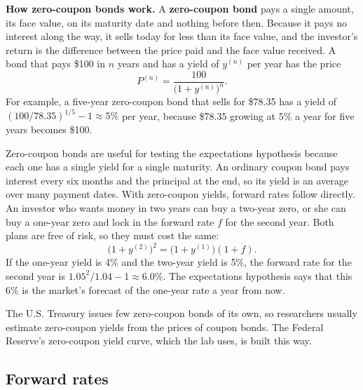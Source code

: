 \begin{callout}
\textbf{How zero-coupon bonds work.} A \textbf{zero-coupon bond} pays a single amount, its face value, on its maturity date and nothing before then. Because it pays no interest along the way, it sells today for less than its face value, and the investor's return is the difference between the price paid and the face value received. A bond that pays \$100 in $n$ years and has a yield of $y^{(n)}$ per year has the price
\begin{equation}
  P^{(n)} = \frac{100}{\bigl(1 + y^{(n)}\bigr)^{n}}.
  \label{eq:07-zero-price}
\end{equation}
For example, a five-year zero-coupon bond that sells for \$78.35 has a yield of $(100/78.35)^{1/5} - 1 \approx 5\%$ per year, because \$78.35 growing at 5\% a year for five years becomes \$100.

Zero-coupon bonds are useful for testing the expectations hypothesis because each one has a single yield for a single maturity. An ordinary coupon bond pays interest every six months and the principal at the end, so its yield is an average over many payment dates. With zero-coupon yields, forward rates follow directly. An investor who wants money in two years can buy a two-year zero, or she can buy a one-year zero and lock in the forward rate $f$ for the second year. Both plans are free of risk, so they must cost the same:
\begin{equation}
  \bigl(1 + y^{(2)}\bigr)^{2} = \bigl(1 + y^{(1)}\bigr)(1 + f).
  \label{eq:07-zero-forward}
\end{equation}
If the one-year yield is 4\% and the two-year yield is 5\%, the forward rate for the second year is $1.05^{2}/1.04 - 1 \approx 6.0\%$. The expectations hypothesis says that this 6\% is the market's forecast of the one-year rate a year from now.

The U.S. Treasury issues few zero-coupon bonds of its own, so researchers usually estimate zero-coupon yields from the prices of coupon bonds. The Federal Reserve's zero-coupon yield curve, which the lab uses, is built this way.
\end{callout}

\subsection{Forward rates}

